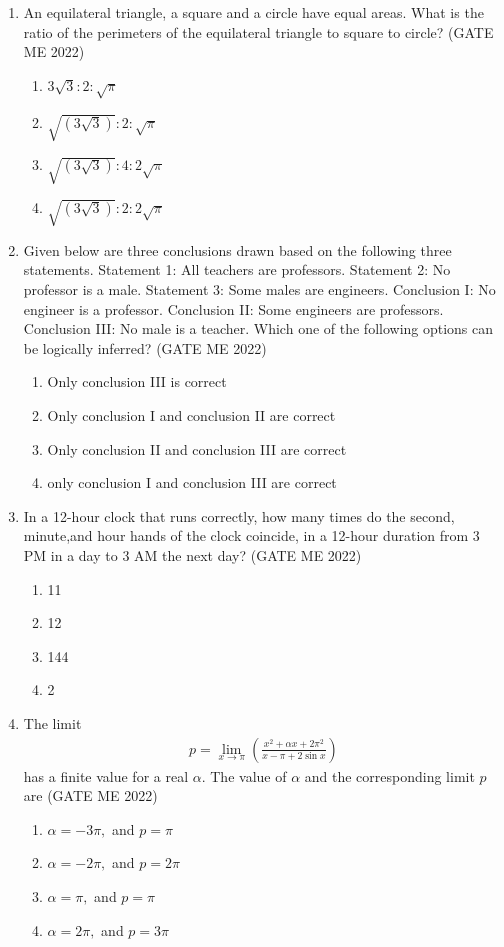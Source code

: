 \documentclass[journal]{IEEEtran}
\numberwithin{equation}{enumi}
\numberwithin{figure}{enumi}
\begin{document}
\begin{enumerate}
\item An equilateral triangle, a square and a circle have equal areas.
What is the ratio of the perimeters of the equilateral triangle to square to circle?
\hfill{(GATE ME 2022)}
\begin{enumerate}
    \item \( 3\sqrt{3} : 2 : \sqrt{\pi} \)
    \item \( \sqrt{(3 \sqrt{3})} : 2 : \sqrt{\pi} \)
    \item \( \sqrt{(3 \sqrt{3})} : 4 : 2\sqrt{\pi} \)
    \item \( \sqrt{(3 \sqrt{3})} : 2 : 2\sqrt{\pi} \)
\end{enumerate}
\item Given below are three conclusions drawn based on the following three
statements.
Statement 1: All teachers are professors.
Statement 2: No professor is a male.
Statement 3: Some males are engineers.
Conclusion I: No engineer is a professor.
Conclusion II: Some engineers are professors.
Conclusion III: No male is a teacher.
Which one of the following options can be logically inferred?
\hfill{(GATE ME 2022)}
\begin{enumerate}
    \item Only conclusion III is correct
\item Only conclusion I and conclusion II are correct
\item Only conclusion II and conclusion III are correct
\item only conclusion I and conclusion III are correct
\end{enumerate}

\item In a 12-hour clock that runs correctly, how many times do the second, minute,and hour hands of the clock coincide, in a 12-hour duration from 3 PM in a day to 3 AM the next day?
\hfill{(GATE ME 2022)}
\begin{multicols}{4}
\begin{enumerate}
    \item 11
    \item 12
    \item 144
    \item 2
\end{enumerate}
\end{multicols}
\item The limit
\begin{align*}
p = \lim_{x \to \pi} \left(\frac{x^2 + \alpha x + 2\pi^2}{x - \pi + 2 \sin x}\right)
\end{align*}
has a finite value for a real \(\alpha\). The value of \(\alpha\) and the corresponding limit \(p\) are
\hfill{(GATE ME 2022)}
\begin{enumerate}
    \item \(\alpha = -3\pi,\) and \(p = \pi\)
    \item \(\alpha = -2\pi,\) and \(p = 2\pi\)
    \item \(\alpha = \pi,\) and \(p = \pi\)
    \item \(\alpha = 2\pi,\) and \(p = 3\pi\)
\end{enumerate}


\end{enumerate}
\end{document}
